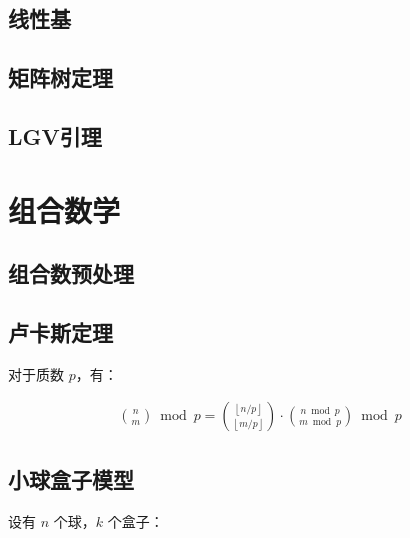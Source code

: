 \documentclass{article}
\begin{document}
\subsection{线性基}

\subsection{矩阵树定理}

\subsection{LGV引理}


\section{组合数学}
\subsection{组合数预处理}

\subsection{卢卡斯定理}

对于质数 $p$，有：

$$
\begin{aligned}
\binom{n}{m}\bmod p = \binom{\left\lfloor n/p \right\rfloor}{\left\lfloor m/p\right\rfloor}\cdot\binom{n\bmod p}{m\bmod p}\bmod p
\end{aligned}
$$



\subsection{小球盒子模型}

设有 $n$ 个球，$k$ 个盒子：
\end{document}
